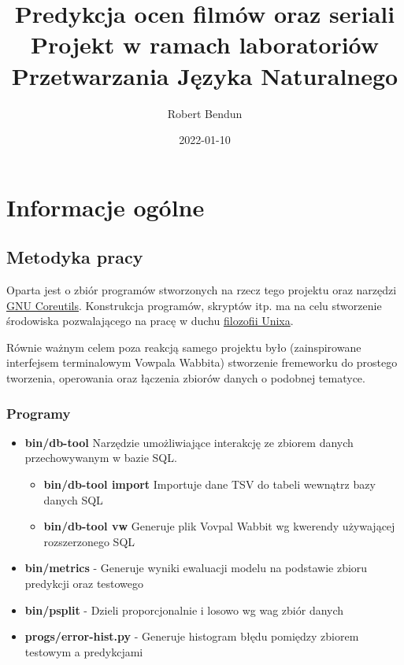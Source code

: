 \documentclass{article}
\title{Predykcja ocen filmów oraz seriali\\ \large Projekt w ramach laboratoriów Przetwarzania Języka Naturalnego}
\author{Robert Bendun}
\date{2022-01-10}
\begin{document}
\maketitle

\tableofcontents

\pagebreak

\section{Informacje ogólne}

\subsection{Metodyka pracy} \label{metodyka}

Oparta jest o zbiór programów stworzonych na rzecz tego projektu oraz narzędzi \href{https://www.gnu.org/software/coreutils/}{GNU Coreutils}. Konstrukcja programów, skryptów itp. ma na celu stworzenie środowiska pozwalającego na pracę w duchu \href{https://en.wikipedia.org/wiki/Unix_philosophy}{filozofii Unixa}.

Równie ważnym celem poza reakcją samego projektu było (zainspirowane interfejsem terminalowym Vowpala Wabbita) stworzenie fremeworku do prostego tworzenia, operowania oraz łączenia zbiorów danych o podobnej tematyce.

\subsubsection{Programy}

\begin{itemize}
\item \textbf{bin/db-tool} Narzędzie umożliwiające interakcję ze zbiorem danych przechowywanym w bazie SQL.
	\begin{itemize}
		\item \textbf{bin/db-tool import} Importuje dane TSV do tabeli wewnątrz bazy danych SQL
		\item \textbf{bin/db-tool vw} Generuje plik Vovpal Wabbit wg kwerendy używającej rozszerzonego SQL
	\end{itemize}
\item \textbf{bin/metrics} - Generuje wyniki ewaluacji modelu na podstawie zbioru predykcji oraz testowego
\item \textbf{bin/psplit} - Dzieli proporcjonalnie i losowo wg wag zbiór danych
\item \textbf{progs/error-hist.py} - Generuje histogram błędu pomiędzy zbiorem testowym a predykcjami
\end{itemize}
\end{document}
